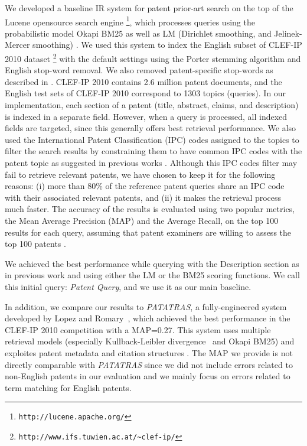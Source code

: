We developed a baseline IR system for patent prior-art search on the top of
the Lucene opensource search engine%
\footnote{\texttt{http://lucene.apache.org/}%
}, which processes queries using the probabilistic
model Okapi BM25 \cite{Robertson1993} as well as LM (Dirichlet
smoothing, and Jelinek-Mercer smoothing) \cite{Zhai2001}. We used
this system to index the English subset of CLEF-IP 2010 dataset%
\footnote{\texttt{http://www.ifs.tuwien.ac.at/\textasciitilde{}clef-ip/}%
} with the default settings using the Porter stemming algorithm \cite{Porter1980} and English stop-word removal. 
We also removed patent-specific stop-words as described in \cite{magdy2012toward}.
CLEF-IP 2010 contains 2.6 million patent documents, and the English
test sets of CLEF-IP 2010 correspond to 1303 topics (queries). In
our implementation, each section of a patent (title, abstract, claims,
and description) is indexed in a separate field. However, when a query
is processed, all indexed fields are targeted, since this generally
offers best retrieval performance. We also used the International
Patent Classification (IPC) codes assigned to the topics to filter
the search results by constraining them to have common IPC codes with
the patent topic as suggested in previous works \cite{lopez2010patatras}.
Although this IPC codes filter may fail to retrieve relevant patents, we
have chosen to keep it for the following reasons: (i) more than 80\%
of the reference patent queries share an IPC code with their associated relevant
patents, and (ii) it makes the retrieval process much faster. The accuracy of the results is evaluated using two popular metrics, the Mean Average Precision (MAP) and the Average Recall, on the top 100 results for each query, assuming that patent examiners are willing to assess the top 100 patents \cite{joho2010survey}. 

We achieved the best performance while querying with the Description
section as in previous work \cite{xue2009transforming} and using
either the LM or the BM25 scoring functions. We call this initial
query: \textit{Patent Query}, and we use it as our main baseline.

In addition, we compare our results to \textit{PATATRAS}, a fully-engineered system developed by Lopez and Romary~\cite{lopez2010patatras}, which achieved the best performance in the CLEF-IP 2010 competition with a MAP=0.27. This system uses multiple retrieval models (especially Kullback-Leibler divergence~\cite{Baeza-Yates2011} and Okapi BM25) and exploites patent metadata and citation structures . The MAP we provide is not directly comparable with \textit{PATATRAS} since we did not include errors related to non-English patents in our evaluation and we mainly focus on errors related to term matching for English patents.  %
% 